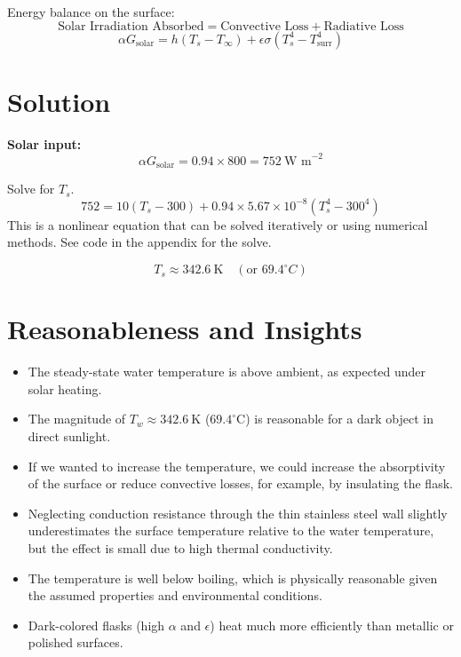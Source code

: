 \documentclass[12pt]{article}
\begin{document}
Energy balance on the surface:
\begin{equation}
    \text{Solar Irradiation Absorbed} = \text{Convective Loss} + \text{Radiative Loss}
\end{equation}
\begin{equation}
\alpha G_{\text{solar}} = h (T_s - T_\infty) + \epsilon \sigma (T_s^4 - T_{\text{surr}}^4)
\end{equation}

\section*{Solution}

\textbf{Solar input:}
\begin{equation}
\alpha G_{\text{solar}} = 0.94 \times 800 = 752~\text{W m}^{-2}
\end{equation}

Solve for $T_s$.
\begin{equation}
752 = 10 (T_s - 300) + 0.94 \times 5.67 \times 10^{-8} (T_s^4 - 300^4)
\end{equation}
This is a nonlinear equation that can be solved iteratively or using numerical methods. See code in the appendix for the solve.

\begin{equation}
T_s \approx 342.6~\text{K} \quad (\text{or } 69.4^\circ C)
\end{equation}

\section*{Reasonableness and Insights}
\begin{itemize}
    \item The steady-state water temperature is above ambient, as expected under solar heating.
    \item The magnitude of $T_w \approx 342.6~\text{K}$ ($69.4^\circ$C) is reasonable for a dark object in direct sunlight.
    \item If we wanted to increase the temperature, we could increase the absorptivity of the surface or reduce convective losses, for example, by insulating the flask.
    \item Neglecting conduction resistance through the thin stainless steel wall slightly underestimates the surface temperature relative to the water temperature, but the effect is small due to high thermal conductivity.
    \item The temperature is well below boiling, which is physically reasonable given the assumed properties and environmental conditions.
    \item Dark-colored flasks (high $\alpha$ and $\epsilon$) heat much more efficiently than metallic or polished surfaces.
\end{itemize}
\end{document}
